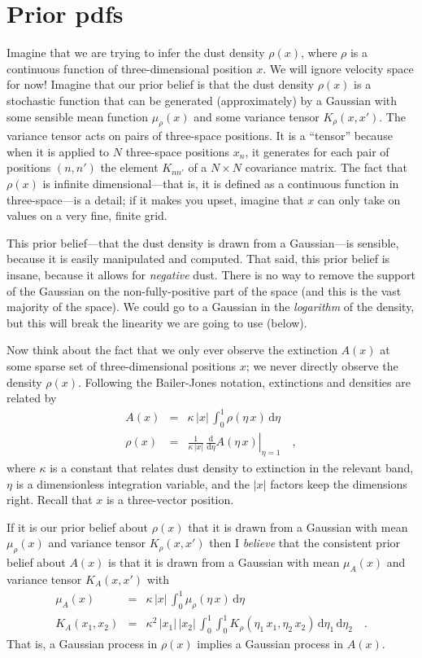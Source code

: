 \documentclass[12pt, letterpaper]{article}
\newcommand{\dd}{\mathrm{d}}
\begin{document}
\section{Prior pdfs}

Imagine that we are trying to infer the dust density $\rho(x)$, where
$\rho$ is a continuous function of three-dimensional position $x$.
We will ignore velocity space for now!
Imagine that our prior belief is that the dust density $\rho(x)$ is a
stochastic function that can be generated (approximately) by a
Gaussian with some sensible mean function $\mu_\rho(x)$ and some variance
tensor $K_\rho(x, x')$.
The variance tensor acts on pairs of three-space positions.
It is a ``tensor'' because when it is applied to $N$ three-space
positions $x_n$, it generates for each pair of positions $(n, n')$ the
element $K_{nn'}$ of a $N\times N$ covariance matrix.
The fact that $\rho(x)$ is infinite dimensional---that is, it is
defined as a continuous function in three-space---is a detail; if it
makes you upset, imagine that $x$ can only take on values on a very
fine, finite grid.

This prior belief---that the dust density is drawn from a
Gaussian---is sensible, because it is easily manipulated and computed.
That said, this prior belief is insane, because it allows for
\emph{negative} dust.
There is no way to remove the support of the Gaussian on the
non-fully-positive part of the space (and this is the vast majority of
the space).
We could go to a Gaussian in the \emph{logarithm} of the density, but
this will break the linearity we are going to use (below).

Now think about the fact that we only ever observe the extinction
$A(x)$ at some sparse set of three-dimensional positions $x$; we never
directly observe the density $\rho(x)$.
Following the Bailer-Jones notation, extinctions and densities are
related by
\begin{eqnarray}
A(x) &=& \kappa\,|x|\,\int_0^1 \rho(\eta\,x)\,\dd\eta
\\
\rho(x) &=& \frac{1}{\kappa\,|x|}\,\left.\frac{\dd}{\dd\eta}A(\eta\,x)\right|_{\eta=1}
\quad,
\end{eqnarray}
where $\kappa$ is a constant that relates dust density to extinction
in the relevant band, $\eta$ is a dimensionless integration variable,
and the $|x|$ factors keep the dimensions right.
Recall that $x$ is a three-vector position.

If it is our prior belief about $\rho(x)$ that it is drawn from a
Gaussian with mean $\mu_\rho(x)$ and variance tensor $K_\rho(x, x')$ then I
\emph{believe} that the consistent prior belief about $A(x)$ is that
it is drawn from a Gaussian with mean $\mu_A(x)$ and variance tensor
$K_A(x, x')$ with
\begin{eqnarray}
\mu_A(x) &=& \kappa\,|x|\,\int_0^1 \mu_\rho(\eta\,x)\,\dd\eta
\\
K_A(x_1, x_2) &=& \kappa^2\,|x_1|\,|x_2|\,\int_0^1\int_0^1 K_\rho(\eta_1\,x_1, \eta_2\,x_2)\,\dd\eta_1\,\dd\eta_2
\quad .
\end{eqnarray}
That is, a Gaussian process in $\rho(x)$ implies a Gaussian process in
$A(x)$.
\end{document}
